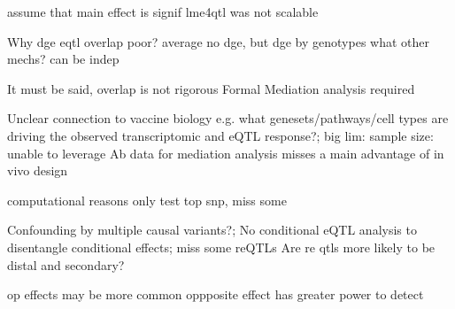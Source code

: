 assume that main effect is signif 
lme4qtl was not scalable


Why dge eqtl overlap poor?
average no dge, but dge by genotypes
what other mechs?
can be indep

It must be said, overlap is not rigorous
Formal Mediation analysis required

Unclear connection to vaccine biology e.g. what genesets/pathways/cell types are driving the observed transcriptomic and eQTL response?;
big lim: sample size: unable to leverage Ab data for mediation analysis
misses a main advantage of in vivo design

computational reasons
only test top snp, miss some 

Confounding by multiple causal variants?;
No conditional eQTL analysis to disentangle conditional effects;
miss some reQTLs
Are re qtls more likely to be distal and secondary?

op effects may be more common
oppposite effect has greater power to detect

